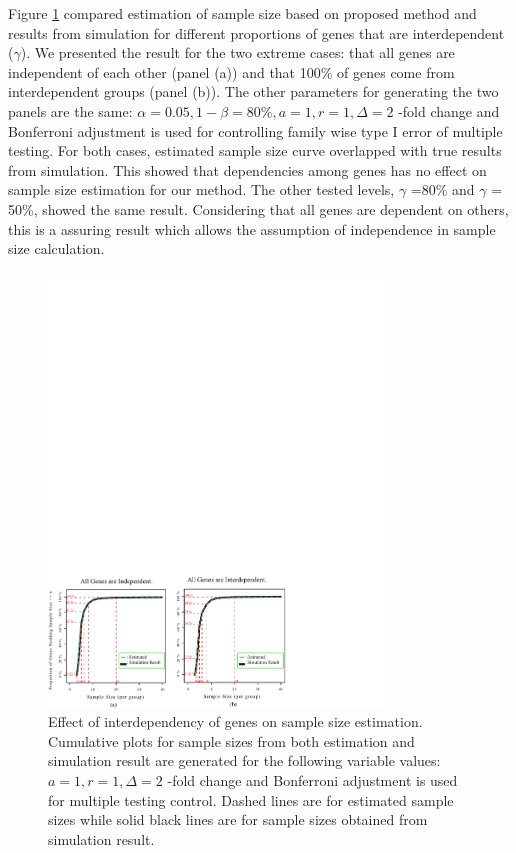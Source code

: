 \documentclass{bioinfo}
\begin{document}
Figure \ref{fig:ResDep} compared estimation of sample size based
on proposed method and results from simulation for different
proportions of genes that are interdependent ($\gamma$). We
presented the result for the two extreme cases: that all genes are
independent of each other (panel (a)) and that 100\% of genes come
from interdependent groups (panel (b)). The other parameters for
generating the two panels are the same: $\alpha = 0.05, 1 - \beta
= 80\%, a = 1, r = 1, \Delta = 2$ -fold change and Bonferroni
adjustment is used for controlling family wise type I error of
multiple testing. For both cases, estimated sample size curve
overlapped with true results from simulation. This showed that
dependencies among genes has no effect on sample size estimation
for our method. The other tested levels, $\gamma$ =80\% and
$\gamma$ = 50\%, showed the same result. Considering that all
genes are dependent on others, this is a assuring result which
allows the assumption of independence in sample size calculation.

\begin{figure}[h]
  \centerline{\includegraphics*[width=3.5in]{ResDepF.pdf}}
  \caption[Effect of interdependency of genes on sample size estimation]
  {Effect of interdependency of genes on sample size estimation.
    Cumulative plots for sample sizes from both estimation and simulation result
    are generated for the following variable values: $a = 1, r = 1, \Delta = 2$ -fold change
    and Bonferroni adjustment is used for multiple testing control. Dashed lines are for estimated sample sizes
    while solid black lines are for sample sizes obtained from simulation result.}
  \label{fig:ResDep}
\end{figure}
\end{document}
